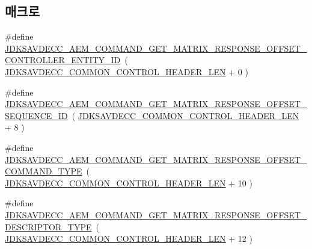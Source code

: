 \subsection*{매크로}
\begin{DoxyCompactItemize}
\item 
\#define \hyperlink{group__command__get__matrix__response_gaa625385f3f3f40e308ee0a7b8e40bc5e}{J\+D\+K\+S\+A\+V\+D\+E\+C\+C\+\_\+\+A\+E\+M\+\_\+\+C\+O\+M\+M\+A\+N\+D\+\_\+\+G\+E\+T\+\_\+\+M\+A\+T\+R\+I\+X\+\_\+\+R\+E\+S\+P\+O\+N\+S\+E\+\_\+\+O\+F\+F\+S\+E\+T\+\_\+\+C\+O\+N\+T\+R\+O\+L\+L\+E\+R\+\_\+\+E\+N\+T\+I\+T\+Y\+\_\+\+ID}~( \hyperlink{group__jdksavdecc__avtp__common__control__header_gaae84052886fb1bb42f3bc5f85b741dff}{J\+D\+K\+S\+A\+V\+D\+E\+C\+C\+\_\+\+C\+O\+M\+M\+O\+N\+\_\+\+C\+O\+N\+T\+R\+O\+L\+\_\+\+H\+E\+A\+D\+E\+R\+\_\+\+L\+EN} + 0 )
\item 
\#define \hyperlink{group__command__get__matrix__response_ga453f07340c7a4392554efa861d5535a3}{J\+D\+K\+S\+A\+V\+D\+E\+C\+C\+\_\+\+A\+E\+M\+\_\+\+C\+O\+M\+M\+A\+N\+D\+\_\+\+G\+E\+T\+\_\+\+M\+A\+T\+R\+I\+X\+\_\+\+R\+E\+S\+P\+O\+N\+S\+E\+\_\+\+O\+F\+F\+S\+E\+T\+\_\+\+S\+E\+Q\+U\+E\+N\+C\+E\+\_\+\+ID}~( \hyperlink{group__jdksavdecc__avtp__common__control__header_gaae84052886fb1bb42f3bc5f85b741dff}{J\+D\+K\+S\+A\+V\+D\+E\+C\+C\+\_\+\+C\+O\+M\+M\+O\+N\+\_\+\+C\+O\+N\+T\+R\+O\+L\+\_\+\+H\+E\+A\+D\+E\+R\+\_\+\+L\+EN} + 8 )
\item 
\#define \hyperlink{group__command__get__matrix__response_ga5799af15dc753ef971de43ce77445795}{J\+D\+K\+S\+A\+V\+D\+E\+C\+C\+\_\+\+A\+E\+M\+\_\+\+C\+O\+M\+M\+A\+N\+D\+\_\+\+G\+E\+T\+\_\+\+M\+A\+T\+R\+I\+X\+\_\+\+R\+E\+S\+P\+O\+N\+S\+E\+\_\+\+O\+F\+F\+S\+E\+T\+\_\+\+C\+O\+M\+M\+A\+N\+D\+\_\+\+T\+Y\+PE}~( \hyperlink{group__jdksavdecc__avtp__common__control__header_gaae84052886fb1bb42f3bc5f85b741dff}{J\+D\+K\+S\+A\+V\+D\+E\+C\+C\+\_\+\+C\+O\+M\+M\+O\+N\+\_\+\+C\+O\+N\+T\+R\+O\+L\+\_\+\+H\+E\+A\+D\+E\+R\+\_\+\+L\+EN} + 10 )
\item 
\#define \hyperlink{group__command__get__matrix__response_ga18b5d3b3fb2fb1bd896754f1f844db51}{J\+D\+K\+S\+A\+V\+D\+E\+C\+C\+\_\+\+A\+E\+M\+\_\+\+C\+O\+M\+M\+A\+N\+D\+\_\+\+G\+E\+T\+\_\+\+M\+A\+T\+R\+I\+X\+\_\+\+R\+E\+S\+P\+O\+N\+S\+E\+\_\+\+O\+F\+F\+S\+E\+T\+\_\+\+D\+E\+S\+C\+R\+I\+P\+T\+O\+R\+\_\+\+T\+Y\+PE}~( \hyperlink{group__jdksavdecc__avtp__common__control__header_gaae84052886fb1bb42f3bc5f85b741dff}{J\+D\+K\+S\+A\+V\+D\+E\+C\+C\+\_\+\+C\+O\+M\+M\+O\+N\+\_\+\+C\+O\+N\+T\+R\+O\+L\+\_\+\+H\+E\+A\+D\+E\+R\+\_\+\+L\+EN} + 12 )
\item 

\end{DoxyCompactItemize}
